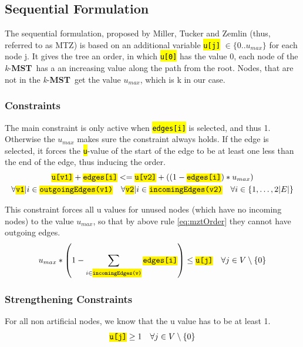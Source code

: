 \documentclass[,%
			paper=a4,%
			DIV14,
			liststotoc,
			bibtotoc,
			draft=false,%
			numbers=noendperiod
			]{scrartcl}
\newcommand{\mst}{\textbf{MST}}
\newcommand{\kmst}{\textit{k}-\mst}
\newcommand{\ilc}[1]{\hl{\texttt{#1}}} %
\newcommand{\vertex}{j}
\newcommand{\edge}{i}
\newcommand{\forallEdges}{\ensuremath{\forall \edge \in \{1, \dotsc, 2|E|\}}}
\begin{document}
\subsection{Sequential Formulation}
The sequential formulation, proposed by Miller, Tucker and Zemlin (thus, referred to as MTZ) is  based on an additional variable \ilc{u[\vertex]} $\in \{0..u_{max}\}$ for each node \vertex. It gives the tree an order, in which \ilc{u[0]} has the value 0, each node of the \kmst\ has a an increasing value along the path from the root. Nodes, that are not in the \kmst\ get the value $u_{max}$, which is k in our case.

\subsubsection{Constraints}
The main constraint is only active when \ilc{edges[\edge]} is selected, and thus 1. Otherwise the $u_{max}$ makes sure the constraint always holds. If the edge is selected, it forces the \ilc{u}-value of the start of the edge to be at least one less than the end of the edge, thus inducing the order.
	\begin{gather}
	\ilc{u[v1]} + \ilc{edges[\edge]} <= \ilc{u[v2]} + ( ( 1 - \ilc{edges[\edge]}) * u_{max} ) \nonumber \\
	\forall \ilc{v1}| \edge \in \ilc{outgoingEdges(v1)}
	\quad
	\forall \ilc{v2} | \edge \in \ilc{incomingEdges(v2)}
	\quad \forallEdges
\label{eq:mztOrder}
\end{gather}

This constraint forces all u values for unused nodes (which have no incoming nodes) to the value $u_{max}$, so that by above rule \eqref{eq:mztOrder} they cannot have outgoing edges.
\begin{equation}\label{eq:mztUnused}
 u_{max}*\left(1 - \sum_{ i \in \ilc{incomingEdges(v)}} \ilc{edges[i]} \right) \leq \ilc{u[\vertex]}
 \quad \forall \vertex \in V  \setminus \{0\}
\end{equation}


\subsubsection{Strengthening Constraints}
For all non artificial nodes, we know that the u value has to be at least 1.
\begin{equation}\label{eq:mztNodes1}
 \ilc{u[\vertex]} \geq 1
 \quad \forall \vertex \in V  \setminus \{0\}
\end{equation}
\end{document}
